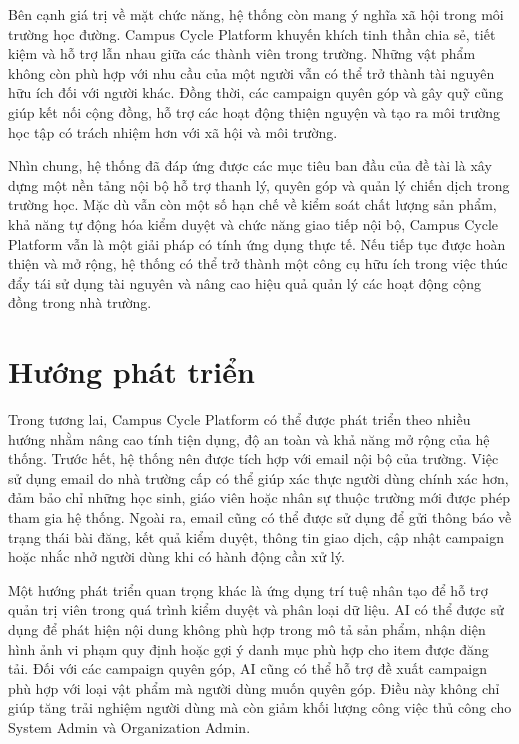 \documentclass[12pt,a4paper]{report}
\begin{document}
Bên cạnh giá trị về mặt chức năng, hệ thống còn mang ý nghĩa xã hội trong môi trường học đường. Campus Cycle Platform khuyến khích tinh thần chia sẻ, tiết kiệm và hỗ trợ lẫn nhau giữa các thành viên trong trường. Những vật phẩm không còn phù hợp với nhu cầu của một người vẫn có thể trở thành tài nguyên hữu ích đối với người khác. Đồng thời, các campaign quyên góp và gây quỹ cũng giúp kết nối cộng đồng, hỗ trợ các hoạt động thiện nguyện và tạo ra môi trường học tập có trách nhiệm hơn với xã hội và môi trường.

Nhìn chung, hệ thống đã đáp ứng được các mục tiêu ban đầu của đề tài là xây dựng một nền tảng nội bộ hỗ trợ thanh lý, quyên góp và quản lý chiến dịch trong trường học. Mặc dù vẫn còn một số hạn chế về kiểm soát chất lượng sản phẩm, khả năng tự động hóa kiểm duyệt và chức năng giao tiếp nội bộ, Campus Cycle Platform vẫn là một giải pháp có tính ứng dụng thực tế. Nếu tiếp tục được hoàn thiện và mở rộng, hệ thống có thể trở thành một công cụ hữu ích trong việc thúc đẩy tái sử dụng tài nguyên và nâng cao hiệu quả quản lý các hoạt động cộng đồng trong nhà trường.

\section{Hướng phát triển}

Trong tương lai, Campus Cycle Platform có thể được phát triển theo nhiều hướng nhằm nâng cao tính tiện dụng, độ an toàn và khả năng mở rộng của hệ thống. Trước hết, hệ thống nên được tích hợp với email nội bộ của trường. Việc sử dụng email do nhà trường cấp có thể giúp xác thực người dùng chính xác hơn, đảm bảo chỉ những học sinh, giáo viên hoặc nhân sự thuộc trường mới được phép tham gia hệ thống. Ngoài ra, email cũng có thể được sử dụng để gửi thông báo về trạng thái bài đăng, kết quả kiểm duyệt, thông tin giao dịch, cập nhật campaign hoặc nhắc nhở người dùng khi có hành động cần xử lý.

Một hướng phát triển quan trọng khác là ứng dụng trí tuệ nhân tạo để hỗ trợ quản trị viên trong quá trình kiểm duyệt và phân loại dữ liệu. AI có thể được sử dụng để phát hiện nội dung không phù hợp trong mô tả sản phẩm, nhận diện hình ảnh vi phạm quy định hoặc gợi ý danh mục phù hợp cho item được đăng tải. Đối với các campaign quyên góp, AI cũng có thể hỗ trợ đề xuất campaign phù hợp với loại vật phẩm mà người dùng muốn quyên góp. Điều này không chỉ giúp tăng trải nghiệm người dùng mà còn giảm khối lượng công việc thủ công cho System Admin và Organization Admin.
\end{document}
